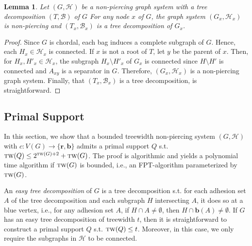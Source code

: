 \documentclass[12pt]{article}
\newcommand{\BB}{\mathcal{B}}
\newcommand{\R}{\mathbf{r}}
\newcommand{\B}{\mathbf{b}}
\newcommand{\HH}{\mathcal{H}}
\newcommand{\tw}{\textsc{tw}}
\newtheorem{lemma}[theorem]{Lemma}
\theoremstyle{case}
\begin{document}
\begin{lemma}
\label{lem:sepnp}
Let $(G,\mathcal{H})$ be a non-piercing graph system with
a tree decomposition $(T,\mathcal{B})$ of $G$ 
For any node $x$ of $G$, the graph system
$(G_x,\HH_x)$ is non-piercing and $(T_x,\BB_x)$
is a tree decomposition of $G_x$.
\end{lemma}
\begin{proof}
Since $G$ is chordal, each bag induces a complete subgraph of $G$. Hence, each
$H_x\in\mathcal{H}_x$ is connected.
If $x$ is not a root of $T$, let $y$ be the parent of $x$.
Then, for $H_x, H'_x\in\mathcal{H}_x$, the subgraph
$H_x\setminus H'_x$ of $G_x$ is connected since $H\setminus H'$ is connected
and $A_{xy}$ is a separator in $G$.
Therefore, $(G_x,\HH_x)$ is a non-piercing graph system.
Finally, that $(T_x,\mathcal{B}_x)$ is a 
tree decomposition, is straightforward.
\end{proof}

\subsection{Primal Support}
\label{sec:primal}
In this section, we show that a bounded treewidth non-piercing
system $(G,\mathcal{H})$ with $c:V(G)\to\{\R,\B\}$ admits
a primal support $Q$ s.t. $\tw(Q)\le 2^{\tw(G)+2}+\tw(G)$.
The proof is algorithmic and yields a polynomial time algorithm if $\tw(G)$ is bounded, i.e., an FPT-algorithm parameterized by
$\tw(G)$.

An \emph{easy tree decomposition} of $G$
is a tree decomposition s.t. 
for each adhesion set $A$ of the tree decomposition and
each subgraph $H$ intersecting $A$, it does so at a blue vertex, i.e.,
for any adhesion set $A$, if $H\cap A\neq\emptyset$, then $H\cap\B(A)\neq\emptyset$.
If $G$ has an easy tree decomposition of treewidth $t$, then it is straightforward to construct a primal support $Q$
s.t. $\tw(Q)\le t$. Moreover, in this case, 
we only require the subgraphs
in $\mathcal{H}$ to be connected.
\end{document}
